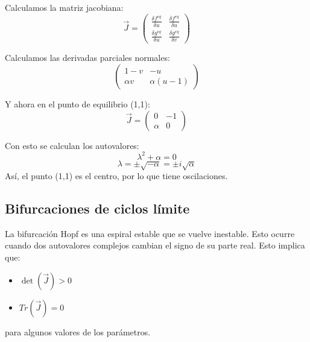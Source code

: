 Calculamos la matriz jacobiana:
$$\vec{J} = \begin{pmatrix}
\frac{\delta f^{eq}}{\delta u} & \frac{\delta f^{eq}}{\delta u} \\
\frac{\delta g^{eq}}{\delta u} & \frac{\delta g^{eq}}{\delta v}
\end{pmatrix}$$

Calculamos las derivadas parciales normales:
$$ \begin{pmatrix}
1 - v & -u \\
\alpha v & \alpha(u - 1)
\end{pmatrix} $$

Y ahora en el punto de equilibrio (1,1):
$$\vec{J} = \begin{pmatrix}
0 & -1 \\ \alpha & 0
\end{pmatrix}$$

Con esto se calculan los autovalores:
$$\lambda^2 + \alpha = 0$$
$$\lambda = \pm \sqrt{- \alpha} = \pm i\sqrt{\alpha}$$
Así, el punto (1,1) es el centro, por lo que tiene oscilaciones.

\subsection{Bifurcaciones de ciclos límite}
La bifurcación Hopf es una espiral estable que se vuelve inestable. Esto ocurre cuando dos autovalores complejos cambian el signo de su parte real. Esto implica que:
\begin{itemize}
\item $\det (\vec{J}) > 0$
\item $Tr(\vec{J}) = 0$
\end{itemize}
para algunos valores de los parámetros.